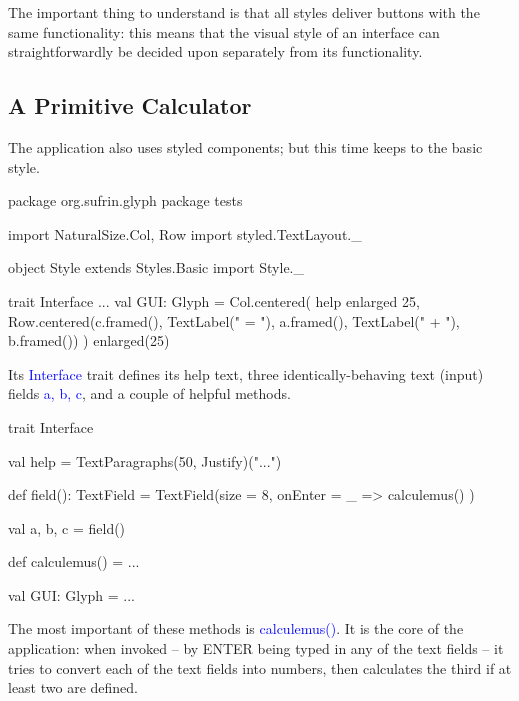 \documentclass[12pt,a4paper]{article}
\def\Scala#1{\textcolor{blue}{\textsf{#1}}}
\def\SS#1{\subsection{#1}}
\begin{document}
\begin{center}
\quad{}
\end{center}

The important thing to understand is that all styles deliver buttons with the
same functionality: this means that the  visual style of an interface can
straightforwardly be decided upon separately from its functionality.



\SS{A Primitive Calculator}


\begin{center}
\end{center}

The application also uses styled components; but this time keeps to
the basic style.

\begin{scala}
package org.sufrin.glyph
package tests

import NaturalSize.{Col, Row}
import styled.TextLayout._

object Style extends Styles.Basic
import Style._

trait Interface {
  ...
  val GUI: Glyph = Col.centered(
    help enlarged 25,
    Row.centered(c.framed(), TextLabel(" = "),
                 a.framed(), TextLabel(" + "), b.framed())
  ) enlarged(25)
}
\end{scala}

Its \Scala{Interface} trait defines its help text, three identically-behaving
text (input) fields \Scala{a, b, c}, and a couple of helpful methods.


\begin{scala}
trait Interface {
  val help = TextParagraphs(50, Justify)("...")

  def field(): TextField =
      TextField(size = 8, onEnter = { _ => calculemus() })

  val a, b, c = field()

  def calculemus() = ... 

  val GUI: Glyph = ...
}
\end{scala}

The most important of
these methods is \Scala{calculemus()}. It is the core of the application: when invoked
-- by \textsf{ENTER} being typed in any of the text fields -- it tries to convert each of the text
fields into numbers, then calculates the third if at least two are defined.
\end{document}
